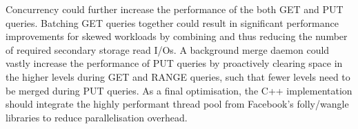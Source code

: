 \documentclass{acm}
\begin{document}
Concurrency could further increase the performance of the both GET and PUT queries. Batching GET queries together could result in significant performance improvements for skewed workloads by combining and thus reducing the number of required secondary storage read I/Os. A background merge daemon could vastly increase the performance of PUT queries by proactively clearing space in the higher levels during GET and RANGE queries, such that fewer levels need to be merged during PUT queries. As a final optimisation, the C++ implementation should integrate the highly performant thread pool from Facebook's folly/wangle libraries to reduce parallelisation overhead.
\end{document}
